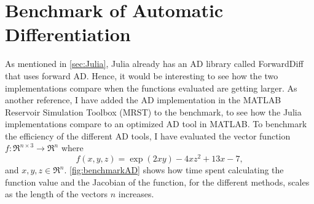 \section{Benchmark of Automatic Differentiation}
As mentioned in \autoref{sec:Julia}, Julia already has an AD library called ForwardDiff \emph{\citep{ForwardDiff}} that uses forward AD. Hence, it would be interesting to see how the two implementations compare when the functions evaluated are getting larger. As another reference, I have added the AD implementation in the MATLAB Reservoir Simulation Toolbox (MRST) \emph{\citep{mrstHomepage}} to the benchmark, to see how the Julia implementations compare to an optimized AD tool in MATLAB. To benchmark the efficiency of the different AD tools, I have evaluated the vector function $f: \Re^{n\times 3} \rightarrow \Re^n $ where
\begin{equation}
\label{eq:benchmarkFunction}
f(x,y,z)  = \exp(2xy) - 4xz^2 + 13x - 7,
\end{equation}
and $x,y,z \in \Re^n$. \autoref{fig:benchmarkAD} shows how time spent calculating the function value and the Jacobian of the function, for the different methods, scales as the length of the vectors $n$ increases.
